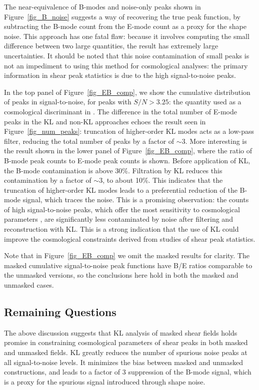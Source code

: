 The near-equivalence of B-modes and noise-only peaks shown in 
Figure~\ref{fig_B_noise} suggests a way of recovering the true peak function,
by subtracting the B-mode count from the E-mode count as a proxy for the 
shape noise. This approach has one fatal flaw: because it involves computing
the small difference between two large quantities, the result has
extremely large uncertainties.  It should be
noted that this noise contamination of small peaks is not an impediment to
using this method for cosmological analyses: the primary information
in shear peak statistics is due to the high signal-to-noise peaks.

In the top panel of Figure~\ref{fig_EB_comp}, we show the cumulative 
distribution of peaks in signal-to-noise, for peaks with $S/N > 3.25$:
the quantity used as a cosmological discriminant in \citet{Dietrich10}.
The difference in the total number of E-mode peaks in the KL and non-KL
approaches echoes the result seen
in Figure~\ref{fig_num_peaks}: truncation of higher-order KL modes acts as
a low-pass filter, reducing the total number of peaks by a factor of $\sim 3$.
More interesting is the result shown in the lower panel of 
Figure~\ref{fig_EB_comp}, where the ratio of B-mode peak counts to E-mode 
peak counts is shown.  
Before application of KL, the B-mode contamination is above 
30\%.  Filtration by KL reduces this contamination by a factor of $\sim 3$,
to about 10\%.  This indicates that the truncation of higher-order KL modes
leads to a preferential reduction of the B-mode signal, which traces
the noise.  This is a promising observation: the counts of
high signal-to-noise peaks, 
which offer the most sensitivity to cosmological parameters 
\citep{Dietrich10}, are significantly less contaminated by noise after 
filtering and reconstruction with KL.  This is a strong indication that 
the use of KL could improve the cosmological 
constraints derived from studies of shear peak statistics.

Note that in Figure~\ref{fig_EB_comp} we omit the masked 
results for clarity.  The masked cumulative signal-to-noise peak 
functions have B/E ratios comparable to the unmasked versions, so 
the conclusions here hold in both the masked and unmasked cases.

\subsection{Remaining Questions}
The above discussion suggests that KL analysis of masked shear fields holds
promise in constraining cosmological parameters of shear peaks in both
masked and unmasked fields.  KL greatly
reduces the number of spurious noise peaks at all signal-to-noise levels.
It minimizes the bias between masked and unmasked constructions, and leads
to a factor of 3 suppression of the B-mode signal, which is a proxy
for the spurious signal introduced through shape noise.

